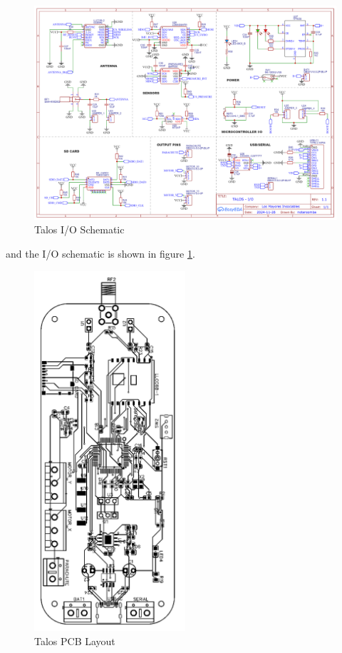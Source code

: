 \documentclass{article}
\begin{document}
\begin{figure}[h]
      \caption{Talos I/O Schematic}
      \label{fig:talos_io_schematic}
      \centering
      \includegraphics[width=\textwidth]{IO.png}
\end{figure}
and the I/O schematic is shown in figure \ref{fig:talos_io_schematic}.
\begin{figure}[h!]
      \caption{Talos PCB Layout}
      \label{fig:talos_pcb_layout}
      \centering
      \includegraphics[width=0.5\textwidth]{PCB.png}
\end{figure}
\end{document}
